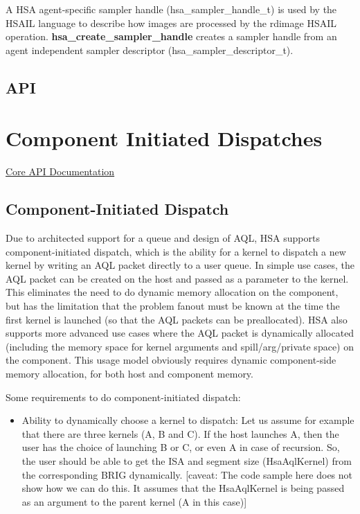 \documentclass{book}
\newcommand{\reffun}[1]{\textbf{#1}}
\newcommand{\reftyp}[1]{#1}
\begin{document}
\begin{appendices}
A HSA agent-specific sampler handle (\reftyp{hsa\_sampler\_handle\_t})
is used by the HSAIL language to describe how images are processed by
the rdimage HSAIL operation. \reffun{hsa\_create\_sampler\_handle}
creates a sampler handle from an agent independent sampler descriptor
(\reftyp{hsa\_sampler\_descriptor\_t}).

\newpage
\hypertarget{Images API}{\section{API} \label{images_api}}


\chapter{Component Initiated Dispatches} \label{architected}
\hypertarget{architectedchptr}{}
\hyperlink{coreapi}{Core API
Documentation}\hypertarget{coreapi_dtde}{}\section{Component-\/\-Initiated
Dispatch}\label{coreapi_dtde}

Due to architected support for a queue and design of AQL,
HSA supports component-\/initiated dispatch, which is the ability
for a kernel to dispatch a new kernel by writing an AQL packet
directly to a user queue. In simple use cases, the AQL packet
can be created on the host and passed as a parameter to the kernel.
This eliminates the need to do dynamic memory allocation on the
component, but has the limitation that the problem fanout must be known
at the time the first kernel is launched (so that the AQL
packets can be preallocated). HSA also supports more advanced
use cases where the AQL packet is dynamically allocated
(including the memory space for kernel arguments and
spill/arg/private space) on the component. This usage model obviously
requires dynamic component-\/side memory allocation, for both host and
component memory.

Some requirements to do component-\/initiated dispatch\-:

\begin{itemize}

\item Ability to dynamically choose a kernel to dispatch\-: Let us
assume for example that there are three kernels (A, B and C). If the
host launches A, then the user has the choice of launching B or C,
or even A in case of recursion. So, the user should be able to get
the ISA and segment size (Hsa\-Aql\-Kernel) from the
corresponding BRIG dynamically. \mbox{[}caveat\-: The code
sample here does not show how we can do this. It assumes that the
Hsa\-Aql\-Kernel is being passed as an argument to the parent kernel
(A in this case)\mbox{]}


\end{itemize}
\end{appendices}
\end{document}
